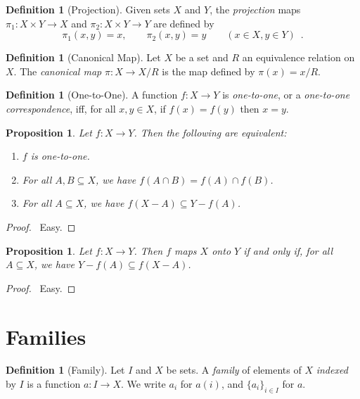 \documentclass{report}
\let\qed\relax
\newtheorem{prop}[ax]{Proposition}
\theoremstyle{definition}
\newtheorem{df}[ax]{Definition}
\begin{document}
\begin{df}[Projection]
Given sets $X$ and $Y$, the \emph{projection} maps $\pi_1 : X \times Y \rightarrow X$ and $\pi_2 : X \times Y \rightarrow Y$ are defined by
\[ \pi_1(x,y) = x, \qquad \pi_2(x,y) = y \qquad (x \in X, y \in Y) \enspace . \]
\end{df}

\begin{df}[Canonical Map]
Let $X$ be a set and $R$ an equivalence relation on $X$. The \emph{canonical map} $\pi : X \rightarrow X / R$ is the map defined by $\pi(x) = x / R$.
\end{df}

\begin{df}[One-to-One]
A function $f : X \rightarrow Y$ is \emph{one-to-one}, or a \emph{one-to-one correspondence}, iff, for all $x,y \in X$, if $f(x) = f(y)$ then $x = y$.
\end{df}

\begin{prop}
Let $f : X \rightarrow Y$. Then the following are equivalent:
\begin{enumerate}
\item $f$ is one-to-one.
\item For all $A,B \subseteq X$, we have $f(A \cap B) = f(A) \cap f(B)$.
\item For all $A \subseteq X$, we have $f(X-A) \subseteq Y - f(A)$.
\end{enumerate}
\end{prop}

\begin{proof}
\pf\ Easy. \qed
\end{proof}

\begin{prop}
Let $f : X \rightarrow Y$. Then $f$ maps $X$ onto $Y$ if and only if, for all $A \subseteq X$, we have $Y - f(A) \subseteq f(X-A)$.
\end{prop}

\begin{proof}
\pf\ Easy. \qed
\end{proof}

\section{Families}

\begin{df}[Family]
Let $I$ and $X$ be sets. A \emph{family} of elements of $X$ \emph{indexed} by $I$ is a function $a : I \rightarrow X$. We write $a_i$ for $a(i)$, and $\{a_i\}_{i \in I}$ for $a$.
\end{df}
\end{document}
